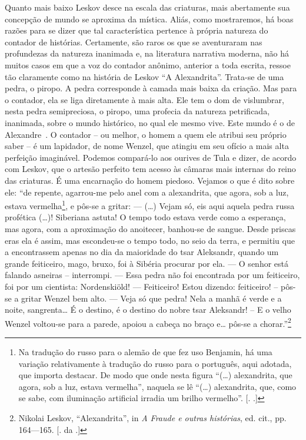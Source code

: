 Quanto mais baixo Leskov desce na escala das criaturas, mais abertamente
sua concepção de mundo se aproxima da mística. Aliás, como mostraremos,
há boas razões para se dizer que tal característica pertence à própria
natureza do contador de histórias. Certamente, são raros os que se
aventuraram nas profundezas da natureza inanimada e, na literatura
narrativa moderna, não há muitos casos em que a voz do contador anônimo,
anterior a toda escrita, ressoe tão claramente como na história de
Leskov ``A Alexandrita''. Trata-se de uma pedra, o piropo. A pedra
corresponde à camada mais baixa da criação. Mas para o contador, ela se
liga diretamente à mais alta. Ele tem o dom de vislumbrar, nesta pedra
semipreciosa, o piropo, uma profecia da natureza petrificada, inanimada,
sobre o mundo histórico, no qual ele mesmo vive. Este mundo é o de
Alexandre~. O contador -- ou melhor, o homem a quem ele atribui seu
próprio saber -- é um lapidador, de nome Wenzel, que atingiu em seu
ofício a mais alta perfeição imaginável. Podemos compará-lo aos ourives
de Tula e dizer, de acordo com Leskov, que o artesão perfeito tem acesso
às câmaras mais internas do reino das criaturas. É uma encarnação do
homem piedoso. Vejamos o que é dito sobre ele: ``de repente, agarrou-me
pelo anel com a alexandrita, que agora, sob a luz, estava
vermelha\footnote{Na tradução do russo para o alemão de que fez uso
  Benjamin, há uma variação relativamente à tradução do russo para o
  português, aqui adotada, que importa destacar. De modo que onde nesta
  figura ``(\ldots{}) alexandrita, que agora, sob a luz, estava
  vermelha'', naquela se lê ``(\ldots{}) alexandrita, que, como se sabe,
  com iluminação artificial irradia um brilho vermelho''. [. .]}, e pôs-se a gritar: --- (\ldots{}) Vejam só, eis aqui aquela pedra
russa profética (\ldots{})! Siberiana astuta! O tempo todo estava verde como
a esperança, mas agora, com a aproximação do anoitecer, banhou-se de
sangue. Desde priscas eras ela é assim, mas escondeu-se o tempo todo, no
seio da terra, e permitiu que a encontrassem apenas no dia da maioridade
do tsar Aleksandr, quando um grande feiticeiro, mago, bruxo, foi à
Sibéria procurar por ela. --- O senhor está falando asneiras --
interrompi. --- Essa pedra não foi encontrada por um feiticeiro, foi por
um cientista: Nordenskiöld! --- Feiticeiro! Estou dizendo: feiticeiro! --
pôs-se a gritar Wenzel bem alto. --- Veja só que pedra! Nela a manhã é
verde e a noite, sangrenta\ldots{} É o destino, é o destino do nobre tsar
Aleksandr! -- E o velho Wenzel voltou-se para a parede, apoiou a cabeça no
braço e\ldots{} pôs-se a chorar.''\footnote{Nikolai Leskov, ``Alexandrita'',
  in \emph{A Fraude e outras histórias}, ed. cit., pp. 164---165. [. da
  .]}

